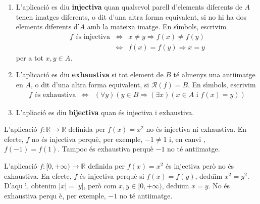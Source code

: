 \begin{enumerate}
\item L'aplicaci\'{o} es diu \textbf{injectiva} quan qualsevol parell
d'elements diferents de $A$ tenen imatges diferents, o dit d'una altra forma
equivalent, si no hi ha dos elements diferents d'$A$ amb la mateixa imatge.
En s\'{\i}mbols, escrivim%
\begin{equation*}
\begin{array}{lll}
f\text{ \'{e}s injectiva} & \Longleftrightarrow & x\neq y\Longrightarrow
f(x)\neq f(y) \\
& \Longleftrightarrow & f(x)=f(y)\Longrightarrow x=y%
\end{array}
\end{equation*}
per a tot $x,y\in A$.

\item L'aplicaci\'{o} es diu \textbf{exhaustiva} si tot element de $B$ t\'{e}
almenys una antiimatge en $A$, o dit d'una altra forma equivalent, si $%
\mathcal{R}\left( f\right) =B$. En s\'{\i}mbols, escrivim%
\begin{equation*}
\begin{array}{lll}
f\text{ \'{e}s exhaustiva} & \Longleftrightarrow & \left( \forall y\right)
\left( y\in B\Longrightarrow\left( \exists x\right) \left( x\in A\text{ i }%
f(x)=y\right) \right)%
\end{array}
\end{equation*}

\item L'apliaci\'{o} es diu \textbf{bijectiva} quan \'{e}s injectiva i
exhaustiva.
\end{enumerate}

\begin{exem}
L'aplicaci\'{o} $f:\mathbb{R}\longrightarrow\mathbb{R}$ definida per $%
f(x)=x^{2}$ no \'{e}s injectiva ni exhaustiva. En efecte, $f$ no \'{e}s
injectiva perqu\`{e}, per exemple, $-1\neq1$ i, en canvi , $f(-1)=f(1)$.
Tampoc \'{e}s exhaustiva perqu\`{e} $-1$ no t\'{e} antiimatge.
\end{exem}

\begin{exem}
L'aplicaci\'{o} $f:[0,+\infty)\longrightarrow\mathbb{R}$ definida per $%
f(x)=x^{2}$ \'{e}s injectiva per\`{o} no \'{e}s exhaustiva. En efecte, $f$
\'{e}s injectiva perqu\`{e} si $f(x)=f(y)$, dedu\"{\i}m $x^{2}=y^{2}$. D'aqu%
\'{\i}, obtenim $\left\vert x\right\vert =\left\vert y\right\vert $, per\`{o}
com $x,y\in\lbrack0,+\infty)$, dedu\"{\i}m $x=y$. No \'{e}s exhaustiva perqu%
\`{e}, per exemple, $-1$ no t\'{e} antiimatge.
\end{exem}

